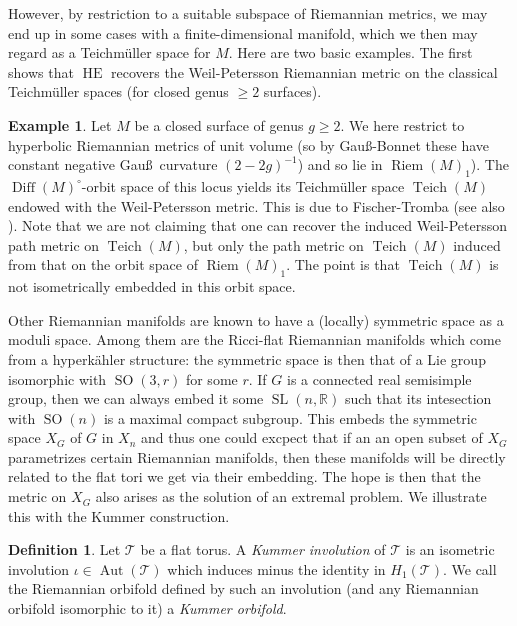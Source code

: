 \documentclass[11pt,letterpaper]{amsart}
\theoremstyle{definition}
\newtheorem{definition}[theorem]{Definition}
\newtheorem{example}[theorem]{Example}
\numberwithin{equation}{section}
\theoremstyle{definition}
\newcommand{\Tc}{\mathcal{T}}
\newcommand{\Rb}{\mathbb{R}}
\DeclareMathOperator{\aut}{Aut}
\DeclareMathOperator{\Riem}{Riem}
\DeclareMathOperator{\SL}{SL}
\DeclareMathOperator{\SO}{SO}
\DeclareMathOperator{\Teich}{Teich}
\DeclareMathOperator{\Diff}{Diff}
\DeclareMathOperator{\HE}{HE}
\begin{document}
However, by  restriction to a 
suitable subspace of Riemannian metrics, we may end up in some cases with a finite-dimensional manifold, which we then 
may regard as a Teichm\"uller space for $M$. Here are two basic examples. The first shows that $\HE$ recovers the Weil-Petersson Riemannian metric on the classical Teichm\"uller spaces (for  closed genus $\ge 2$ surfaces). 

\begin{example}\label{example:hyperbolic}
Let $M$ be a closed surface of  genus $g\ge 2$. We here  restrict to hyperbolic  Riemannian metrics of unit volume (so by Gau\ss-Bonnet these have  constant negative Gau\ss\ curvature $(2-2g)^{-1}$) and  so lie in $\Riem (M)_{1}$). The  $\Diff(M)^\circ$-orbit space  of this locus yields its Teichm\"uller space $\Teich(M)$ 
endowed with the Weil-Petersson metric. This is due to Fischer-Tromba \cite{FT84} (see also \cite[\S 3.2]{Yam14}). Note that we are not claiming that one can recover the induced 
Weil-Petersson path metric on $\Teich(M)$, but only the path metric on $\Teich(M)$ induced from that on the orbit space of $\Riem (M)_{1}$. The point is that $\Teich(M)$ is not isometrically embedded in this orbit space.
\end{example}

Other Riemannian manifolds are known to have a (locally) symmetric space as a moduli space. Among them are the Ricci-flat
Riemannian manifolds which come from a hyperk\"ahler structure: the symmetric space is then that of  a Lie group isomorphic with $\SO (3, r)$ for some $r$. If $G$ is a connected real semisimple group, then we can always embed it some $\SL(n,\Rb)$ such that
its intesection with $\SO(n)$ is a maximal compact subgroup. This embeds the symmetric space $X_G$  of $G$ in $X_n$ and thus one could excpect that if an an open subset of  $X_G$ parametrizes certain   Riemannian manifolds, then these manifolds will be directly related to the  flat tori we get via their embedding. The hope is then  that the metric on $X_G$ also arises as the solution of an extremal problem. We illustrate this with the Kummer construction.

\begin{definition}
Let  $\Tc$ be a flat torus. A \emph{Kummer involution} of $\Tc$ is an  isometric involution $\iota\in \aut(\Tc)$ which induces minus the identity in $H_1(\Tc)$. We call  the Riemannian orbifold defined by such an involution  (and any Riemannian orbifold  isomorphic to it)  a \emph{Kummer orbifold}.
\end{definition}
\end{document}
